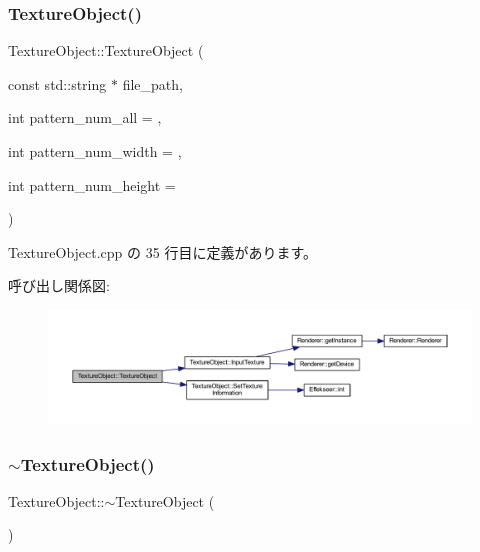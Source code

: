 \subsubsection{\texorpdfstring{Texture\+Object()}{TextureObject()}}
{\footnotesize\ttfamily Texture\+Object\+::\+Texture\+Object (\begin{DoxyParamCaption}\item[{const std\+::string $\ast$}]{file\+\_\+path,  }\item[{int}]{pattern\+\_\+num\+\_\+all = {},  }\item[{int}]{pattern\+\_\+num\+\_\+width = {},  }\item[{int}]{pattern\+\_\+num\+\_\+height = {} }\end{DoxyParamCaption})}



 Texture\+Object.\+cpp の 35 行目に定義があります。

呼び出し関係図\+:
\nopagebreak
\begin{figure}[H]
\begin{center}
\leavevmode
\includegraphics[width=350pt]{class_texture_object_add74bde2c60ec3d61229ce70b26602f2_cgraph}
\end{center}
\end{figure}
\mbox{\label{class_texture_object_aeed25fa5ca8e892b96145f4a649e090a}} 
\subsubsection{\texorpdfstring{$\sim$\+Texture\+Object()}{~TextureObject()}}
{\footnotesize\ttfamily Texture\+Object\+::$\sim$\+Texture\+Object (\begin{DoxyParamCaption}{ }\end{DoxyParamCaption})\hspace{0.3cm}{\ttfamily [virtual]}}



